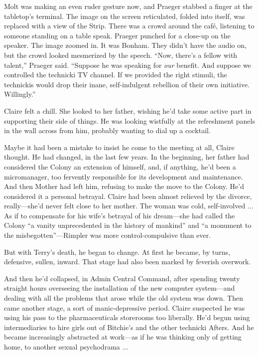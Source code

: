 Molt was making an even ruder gesture now, and Praeger stabbed a finger at the tabletop's terminal. The image on the screen reticulated, folded into itself, was replaced with a view of the Strip. There was a crowd around the café, listening to someone standing on a table speak. Praeger punched for a close-up on the speaker. The image zoomed in. It was Bonham. They didn't have the audio on, but the crowd looked mesmerized by the speech. ``Now, there's a fellow with talent,'' Praeger said. ``Suppose he was speaking for \textit{our} benefit. And suppose we controlled the technicki TV channel. If we provided the right stimuli, the technickis would drop their inane, self-indulgent rebellion of their own initiative. Willingly.''

Claire felt a chill. She looked to her father, wishing he'd take some active part in supporting their side of things. He was looking wistfully at the refreshment panels in the wall across from him, probably wanting to dial up a cocktail.

Maybe it had been a mistake to insist he come to the meeting at all, Claire thought. He had changed, in the last few years. In the beginning, her father had considered the Colony an extension of himself, and, if anything, he'd been a micromanager, too fervently responsible for its development and maintenance. And then Mother had left him, refusing to make the move to the Colony. He'd considered it a personal betrayal. Claire had been almost relieved by the divorce, really---she'd never felt close to her mother. The woman was cold, self-involved ... As if to compensate for his wife's betrayal of his dream---she had called the Colony ``a vanity unprecedented in the history of mankind'' and ``a monument to the misbegotten''---Rimpler was more control-compulsive than ever.

But with Terry's death, he began to change. At first he became, by turns, defensive, sullen, inward. That stage had also been marked by feverish overwork.

And then he'd collapsed, in Admin Central Command, after spending twenty straight hours overseeing the installation of the new computer system---and dealing with all the problems that arose while the old system was down. Then came another stage, a sort of manic-depressive period. Claire suspected he was using his pass to the pharmaceuticals storerooms too liberally. He'd begun using intermediaries to hire girls out of Bitchie's and the other technicki Afters. And he became increasingly abstracted at work---as if he was thinking only of getting home, to another sexual psychodrama ...

